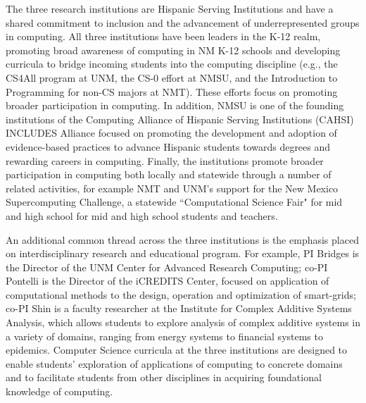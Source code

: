 The three research institutions are Hispanic Serving Institutions and have a shared commitment to inclusion and the advancement of underrepresented groups in computing.
All three institutions have been leaders in the K-12 realm, promoting broad awareness of computing in NM K-12 schools 
and developing curricula to bridge incoming students into the computing discipline (e.g., the CS4All program at UNM, the CS-0 effort at NMSU, and the Introduction to Programming for non-CS majors at NMT). These efforts focus on promoting broader participation in computing. 
In addition, NMSU is one of the founding institutions of the Computing Alliance of Hispanic Serving Institutions (CAHSI) INCLUDES Alliance focused on promoting the development and adoption of evidence-based practices to advance Hispanic students towards degrees and rewarding careers in computing. 
Finally, the institutions promote broader participation in computing both locally and statewide through a number of related activities, for example NMT and UNM's support for the New Mexico Supercomputing Challenge, a statewide ``Computational Science Fair" for mid and high school for mid and high school students and teachers.

An additional common thread across the three institutions is the emphasis placed on interdisciplinary research and educational program. For example, PI Bridges is the Director of the UNM Center for Advanced Research Computing; co-PI Pontelli is the Director of the iCREDITS Center, focused on application of computational methods to the design, operation and optimization of smart-grids; co-PI Shin is a faculty researcher at the Institute for Complex Additive Systems Analysis, which allows students to explore analysis of complex additive systems in a variety of domains, ranging from energy systems to financial systems to epidemics. Computer Science curricula at the three institutions are  designed to enable students' exploration of applications of computing to concrete domains and to facilitate students from other disciplines in acquiring foundational knowledge of computing. 


